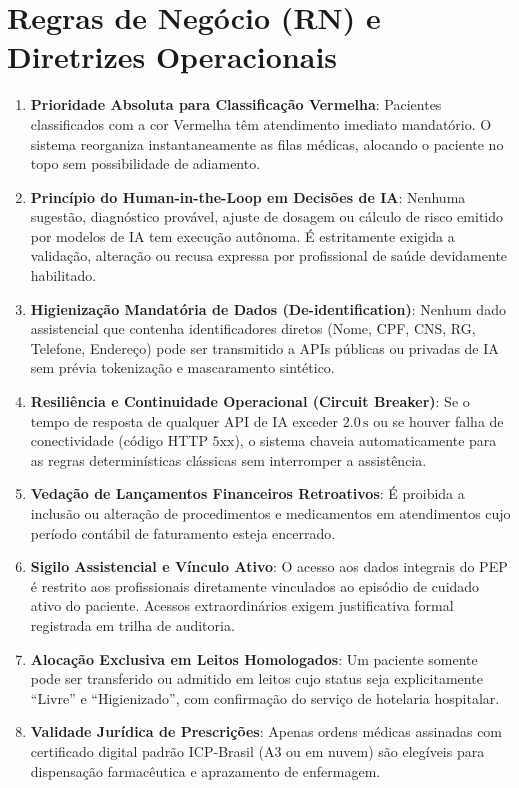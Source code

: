 \documentclass[12pt,oneside,a4paper,article]{abntex2}
\begin{document}
\section{Regras de Negócio (RN) e Diretrizes Operacionais}
\begin{enumerate}[label=\textbf{RN-\arabic*:}, leftmargin=*]
  \item \textbf{Prioridade Absoluta para Classificação Vermelha}: Pacientes classificados com a cor Vermelha têm atendimento imediato mandatório. O sistema reorganiza instantaneamente as filas médicas, alocando o paciente no topo sem possibilidade de adiamento.
  \item \textbf{Princípio do Human-in-the-Loop em Decisões de IA}: Nenhuma sugestão, diagnóstico provável, ajuste de dosagem ou cálculo de risco emitido por modelos de IA tem execução autônoma. É estritamente exigida a validação, alteração ou recusa expressa por profissional de saúde devidamente habilitado.
  \item \textbf{Higienização Mandatória de Dados (De-identification)}: Nenhum dado assistencial que contenha identificadores diretos (Nome, CPF, CNS, RG, Telefone, Endereço) pode ser transmitido a APIs públicas ou privadas de IA sem prévia tokenização e mascaramento sintético.
  \item \textbf{Resiliência e Continuidade Operacional (Circuit Breaker)}: Se o tempo de resposta de qualquer API de IA exceder $2.0\,\text{s}$ ou se houver falha de conectividade (código HTTP $5\text{xx}$), o sistema chaveia automaticamente para as regras determinísticas clássicas sem interromper a assistência.
  \item \textbf{Vedação de Lançamentos Financeiros Retroativos}: É proibida a inclusão ou alteração de procedimentos e medicamentos em atendimentos cujo período contábil de faturamento esteja encerrado.
  \item \textbf{Sigilo Assistencial e Vínculo Ativo}: O acesso aos dados integrais do PEP é restrito aos profissionais diretamente vinculados ao episódio de cuidado ativo do paciente. Acessos extraordinários exigem justificativa formal registrada em trilha de auditoria.
  \item \textbf{Alocação Exclusiva em Leitos Homologados}: Um paciente somente pode ser transferido ou admitido em leitos cujo status seja explicitamente ``Livre'' e ``Higienizado'', com confirmação do serviço de hotelaria hospitalar.
  \item \textbf{Validade Jurídica de Prescrições}: Apenas ordens médicas assinadas com certificado digital padrão ICP-Brasil (A3 ou em nuvem) são elegíveis para dispensação farmacêutica e aprazamento de enfermagem.

\end{enumerate}
\end{document}

